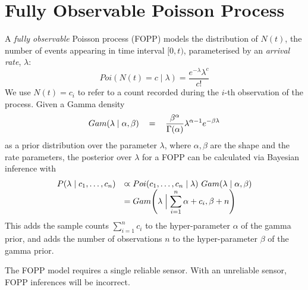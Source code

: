 
\section{Fully Observable Poisson Process}
\label{sec:preliminaries}

A \emph{fully observable} Poisson process (FOPP) models the distribution of $N(t)$, the number of events appearing in time interval $[0, t)$, parameterised by an \textit{arrival rate}, $\lambda$:
\begin{equation}
    \label{eq:pmf_poisson}
	Poi(N(t) = c \mid \lambda) = \frac{e ^{-\lambda} \lambda ^{c}}{c!}
\end{equation}
We use $N(t) = c_i$ to refer to a count recorded during the $i$-th observation of the process.
Given a Gamma density
\begin{equation}
    \label{eq:pdf_gamma}
    \begin{tabular}{rcl}
        $Gam(\lambda \mid \alpha, \beta)$ & = & $\displaystyle\frac{\beta ^{\alpha}}{\Gamma (\alpha)} \lambda ^{\alpha - 1} e^{-\beta \lambda}$ \\ [1ex]
    \end{tabular}
\end{equation}
as a prior distribution over the parameter $\lambda$, where $\alpha, \beta$ are the shape and the rate parameters, the posterior over $\lambda$ for a FOPP can be  calculated via Bayesian inference with
\begin{equation}
    \label{eq:posterior_fopp}
    \begin{array}{lll}
        P(\lambda \mid c_1, \ldots, c_n) & \varpropto Poi(c_1, \ldots, c_n \mid \lambda) ~ Gam(\lambda \mid \alpha, \beta) \\
         & = Gam \Bigg(\lambda \Bigm| \displaystyle\sum_{i=1}^{n} \alpha + c_i, \beta + n \Bigg)
    \end{array}
\end{equation}
This adds the sample counts $\sum_{i=1}^{n} c_i$ to the hyper-parameter $\alpha$ of the gamma prior, and adds the number of observations $n$ to the hyper-parameter $\beta$ of the gamma prior.

The FOPP model requires a single reliable sensor. With an unreliable sensor, FOPP inferences will be incorrect.